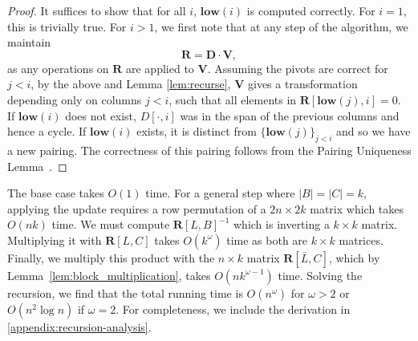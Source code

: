 \documentclass[10pt,a4paper]{article}
\newcommand{\matsize}[2]{#1\times #2}
\newcommand{\matexp}{\omega}
\newcommand{\mat}[1]{\mathbf{#1}}
\newcommand{\low}{\mathbf{low}}
\begin{document}
\begin{proof}
It suffices to show that for all $i$, $\low(i)$ is computed correctly. For $i=1$, this is trivially true. For $i>1$, we first note that at any step of the algorithm, we maintain 
\[\mat{R} = \mat{D}\cdot \mat{V},\]
as any operations on $\mat{R}$ are applied to $\mat{V}$.  
Assuming the pivots are correct for $j<i$, by the above and Lemma \ref{lem:recurse}, $\mat{V}$ gives a transformation depending only on columns $j<i$, such that all elements in $\mat{R}[\low (j),i]=0$. If $\low (i)$ does not exist, $D[\cdot,i]$ was in the span of the previous columns and hence a cycle.  If $\low (i)$ exists, it  is distinct from $\{\low (j)\}_{j<i}$ and so we have a new pairing. The correctness of this pairing follows from the Pairing Uniqueness Lemma~\cite{cohen2006vines}. 
\end{proof}
The base case takes $O(1)$ time. For a general step where $|B|=|C|=k$,  applying
the update requires a row permutation of a $\matsize{2n}{2k}$ matrix which takes
$O(nk)$ time. We must compute $\mat{R}[L,B]^{-1}$ which is inverting a $\matsize{k}{k}$ matrix.   Multiplying it with $\mat{R}[L,C]$  takes $O(k^{\matexp})$ time as both are $\matsize{k}{k}$ matrices. Finally, we 
multiply this product with the $\matsize{n}{k}$ matrix $\mat{R}[\bar{L},C]$, which by Lemma~\ref{lem:block_multiplication}, takes
$O(nk^{\matexp-1})$ time.
Solving
the recursion, we find that the total running time is  $O(n^{\matexp})$ for
$\matexp>2$ or $O(n^2\log n)$ if $\matexp=2$. For completeness, we include the
derivation in  \cref{appendix:recursion-analysis}.
\end{document}
